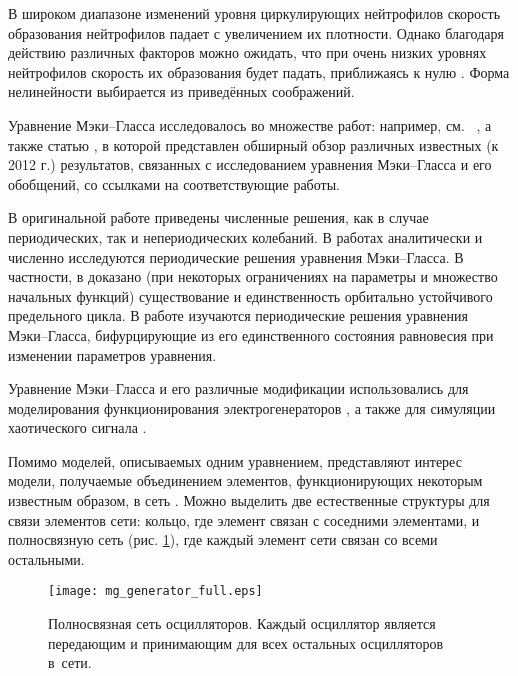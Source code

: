 В широком диапазоне изменений уровня циркулирующих нейтрофилов скорость образования нейтрофилов падает с увеличением их плотности. Однако благодаря действию различных факторов можно ожидать, что при очень низких уровнях нейтрофилов скорость их образования будет падать, приближаясь к нулю \cite[с. 85]{Mackey1977}. Форма нелинейности выбирается из приведённых соображений.

Уравнение Мэки--Гласса исследовалось во множестве работ: например, см.~ \cite{Junges2012, Su2011, Wu2007, Kubyshkin2016, Krisztin2020, Bartha2021}, а также статью \cite{Berezansky2012}, в которой представлен обширный обзор различных известных (к 2012 г.) результатов, связанных с исследованием уравнения Мэки--Гласса и его обобщений, со ссылками на соответствующие работы. 

В оригинальной работе \cite{Mackey1977} приведены численные решения, как в случае периодических, так и непериодических колебаний. В работах \cite{Krisztin2020, Bartha2021} аналитически и численно исследуются периодические решения уравнения Мэки--Гласса. В частности, в \cite{Bartha2021} доказано (при некоторых ограничениях на параметры и множество начальных функций) существование и единственность орбитально устойчивого предельного цикла. В работе \cite{Kubyshkin2016} изучаются периодические решения уравнения Мэки--Гласса, бифурцирующие из его единственного состояния равновесия при изменении параметров уравнения.

Уравнение Мэки--Гласса и его различные модификации использовались для моделирования функционирования электрогенераторов \cite{Tateno2012, Namajunas1995, Glyzin2018, Glyzin2018a}, а также для симуляции хаотического сигнала \cite{Grassberger1983, Amil2015, Amil2015a, Shahverdiev2006}.

Помимо моделей, описываемых одним уравнением, представляют интерес модели, получаемые объединением элементов, функционирующих некоторым известным образом, в сеть \cite{Glyzin2022}. Можно выделить две естественные структуры для связи элементов сети: кольцо, где элемент связан с соседними элементами, и полносвязную сеть (рис. \ref{fig:full_mesh:intro}), где каждый элемент сети связан со всеми остальными.

\begin{figure}[ht]
	\centering
	\texttt{[image: mg\_generator\_full.eps]}
	\caption{Полносвязная сеть осцилляторов. Каждый осциллятор является передающим и принимающим для всех остальных осцилляторов в~сети.}
	\label{fig:full_mesh:intro}
\end{figure}

